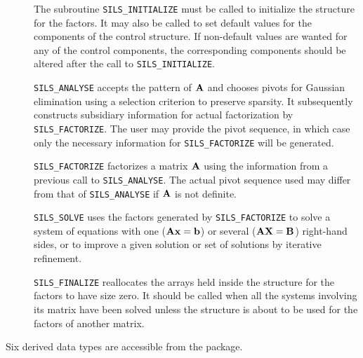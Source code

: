 \documentclass{galahad}
\newcommand{\packagename}{SILS}
\begin{document}
\begin{description} 
 
\item[] The subroutine {\tt \packagename\_INITIALIZE} must be called to 
initialize the 
structure for the factors. It may also be called to set default values 
for the components of the control structure. If non-default values are 
wanted for any of the control components, the corresponding components 
should be altered after the call to {\tt \packagename\_INITIALIZE}. 
  
\item[] {\tt \packagename\_ANALYSE} accepts the pattern of ${\mathbf{A}}$ 
 and chooses  pivots 
 for Gaussian elimination using a selection criterion to preserve 
 sparsity.  It subsequently constructs subsidiary information for 
 actual factorization by {\tt \packagename\_FACTORIZE}. The user may provide
 the pivot sequence, in which case only the necessary information for 
 {\tt \packagename\_FACTORIZE} will be generated. 
 
\item[] {\tt \packagename\_FACTORIZE} factorizes a matrix ${\mathbf{A}}$ using the 
information 
 from a previous call to {\tt \packagename\_ANALYSE}. The actual pivot sequence 
 used may differ from that of {\tt \packagename\_ANALYSE} if ${\mathbf{A}}$ is not 
definite. 
 
\item[] {\tt \packagename\_SOLVE} uses the factors generated by 
  {\tt \packagename\_FACTORIZE} to 
  solve a system of equations with one (${\mathbf{A}} {\mathbf{x}} = {\mathbf{b}}$) 
  or several (${\mathbf{A}} {\mathbf{X}} = {\mathbf{B}}$) right-hand sides, 
  or to improve a given solution or set of solutions 
  by iterative refinement. 
 
\item[] {\tt \packagename\_FINALIZE} reallocates the arrays held inside the  
  structure for the factors to have size zero. It should be called 
  when all the systems involving its matrix have been solved unless 
  the structure is about to be used for the factors of another matrix. 
  
\end{description} 






\galtypes
Six derived data types are accessible from the package.
\end{document}
